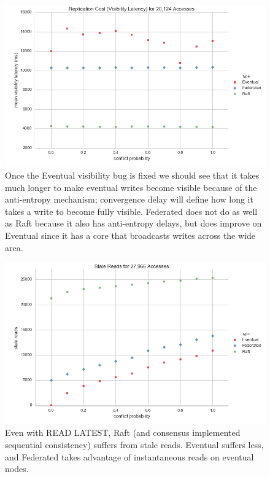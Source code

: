 \documentclass[11pt,letterpaper]{article}
\begin{document}
\begin{figure}[!h]
    \centering
        \includegraphics[width=\textwidth]{figures/visibility_latency.png}
        \caption{\textsf{Once the Eventual visibility bug is fixed we should see that it takes much longer to make eventual writes become visible because of the anti-entropy mechanism; convergence delay will define how long it takes a write to become fully visible. Federated does not do as well as Raft because it also has anti-entropy delays, but does improve on Eventual since it has a core that broadcasts writes across the wide area.}}
        \label{fig:visibility_latency}
\end{figure}

\begin{figure}[!h]
    \centering
        \includegraphics[width=\textwidth]{figures/stale_reads.png}
        \caption{\textsf{Even with READ LATEST, Raft (and consensus implemented sequential consistency) suffers from stale reads. Eventual suffers less, and Federated takes advantage of instantaneous reads on eventual nodes.}}
        \label{fig:stale_reads}
\end{figure}
\end{document}
